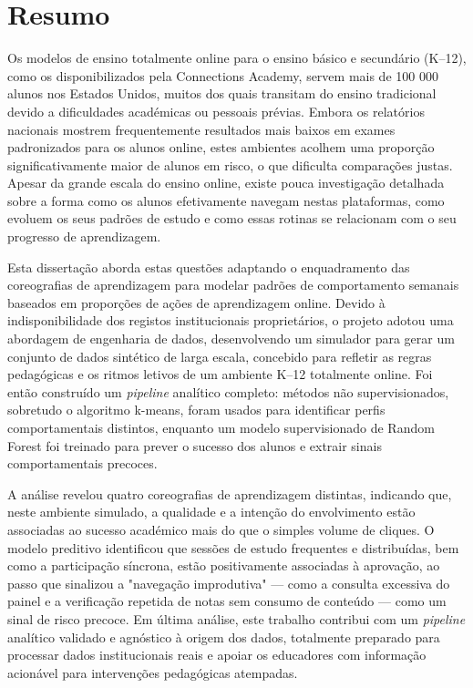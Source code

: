 \chapter*{Resumo}
%
Os modelos de ensino totalmente online para o ensino básico e secundário (K--12), como os disponibilizados pela Connections Academy, servem mais de 100 000 alunos nos Estados Unidos, muitos dos quais transitam do ensino tradicional devido a dificuldades académicas ou pessoais prévias. Embora os relatórios nacionais mostrem frequentemente resultados mais baixos em exames padronizados para os alunos online, estes ambientes acolhem uma proporção significativamente maior de alunos em risco, o que dificulta comparações justas. Apesar da grande escala do ensino online, existe pouca investigação detalhada sobre a forma como os alunos efetivamente navegam nestas plataformas, como evoluem os seus padrões de estudo e como essas rotinas se relacionam com o seu progresso de aprendizagem.

Esta dissertação aborda estas questões adaptando o enquadramento das coreografias de aprendizagem para modelar padrões de comportamento semanais baseados em proporções de ações de aprendizagem online. Devido à indisponibilidade dos registos institucionais proprietários, o projeto adotou uma abordagem de engenharia de dados, desenvolvendo um simulador para gerar um conjunto de dados sintético de larga escala, concebido para refletir as regras pedagógicas e os ritmos letivos de um ambiente K--12 totalmente online. Foi então construído um \textit{pipeline} analítico completo: métodos não supervisionados, sobretudo o algoritmo k-means, foram usados para identificar perfis comportamentais distintos, enquanto um modelo supervisionado de Random Forest foi treinado para prever o sucesso dos alunos e extrair sinais comportamentais precoces.

A análise revelou quatro coreografias de aprendizagem distintas, indicando que, neste ambiente simulado, a qualidade e a intenção do envolvimento estão associadas ao sucesso académico mais do que o simples volume de cliques. O modelo preditivo identificou que sessões de estudo frequentes e distribuídas, bem como a participação síncrona, estão positivamente associadas à aprovação, ao passo que sinalizou a "navegação improdutiva" --- como a consulta excessiva do painel e a verificação repetida de notas sem consumo de conteúdo --- como um sinal de risco precoce. Em última análise, este trabalho contribui com um \textit{pipeline} analítico validado e agnóstico à origem dos dados, totalmente preparado para processar dados institucionais reais e apoiar os educadores com informação acionável para intervenções pedagógicas atempadas.

